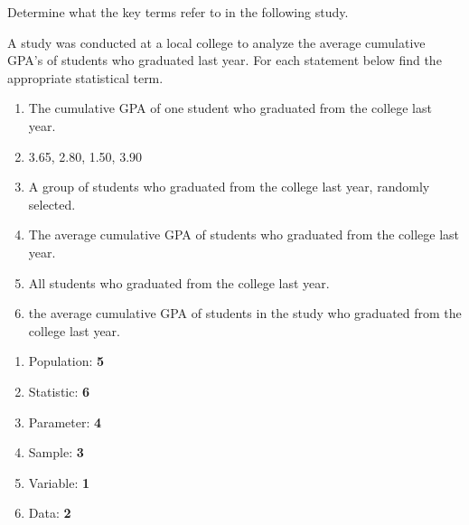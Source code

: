 \documentclass[
  letterpaper,
  DIV=11,
  numbers=noendperiod]{scrreprt}
\providecommand{\tightlist}{%
  \setlength{\itemsep}{0pt}\setlength{\parskip}{0pt}}\usepackage{longtable,booktabs,array}
\begin{document}
\begin{tcolorbox}[enhanced jigsaw, colframe=quarto-callout-note-color-frame, bottomtitle=1mm, colbacktitle=quarto-callout-note-color!10!white, bottomrule=.15mm, toprule=.15mm, breakable, leftrule=.75mm, left=2mm, rightrule=.15mm, colback=white, opacityback=0, opacitybacktitle=0.6, toptitle=1mm, titlerule=0mm, title=\textcolor{quarto-callout-note-color}{\faInfo}\hspace{0.5em}{Problem}, arc=.35mm, coltitle=black]

Determine what the key terms refer to in the following study.

A study was conducted at a local college to analyze the average
cumulative GPA's of students who graduated last year. For each statement
below find the appropriate statistical term.

\begin{enumerate}
\def\labelenumi{\arabic{enumi}.}
\tightlist
\item
  The cumulative GPA of one student who graduated from the college last
  year.
\item
  3.65, 2.80, 1.50, 3.90
\item
  A group of students who graduated from the college last year, randomly
  selected.
\item
  The average cumulative GPA of students who graduated from the college
  last year.
\item
  All students who graduated from the college last year.
\item
  the average cumulative GPA of students in the study who graduated from
  the college last year.
\end{enumerate}

\end{tcolorbox}

\begin{tcolorbox}[enhanced jigsaw, colframe=quarto-callout-tip-color-frame, bottomtitle=1mm, colbacktitle=quarto-callout-tip-color!10!white, bottomrule=.15mm, toprule=.15mm, breakable, leftrule=.75mm, left=2mm, rightrule=.15mm, colback=white, opacityback=0, opacitybacktitle=0.6, toptitle=1mm, titlerule=0mm, title=\textcolor{quarto-callout-tip-color}{\faLightbulb}\hspace{0.5em}{Solution}, arc=.35mm, coltitle=black]

\begin{enumerate}
\def\labelenumi{\arabic{enumi}.}
\tightlist
\item
  Population: \textbf{5}
\item
  Statistic: \textbf{6}
\item
  Parameter: \textbf{4}
\item
  Sample: \textbf{3}
\item
  Variable: \textbf{1}
\item
  Data: \textbf{2}
\end{enumerate}

\end{tcolorbox}
\end{document}
